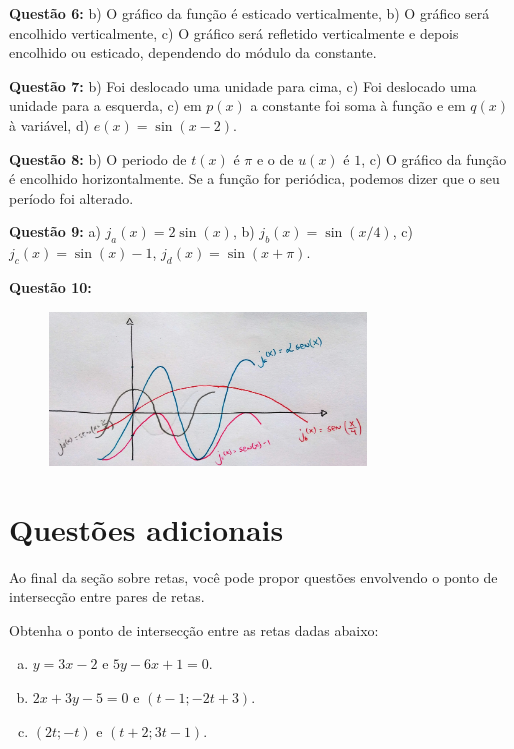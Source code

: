 \documentclass[main_estudante.tex]{subfiles}
\begin{document}
\noindent\textbf{Questão 6:} b) O gráfico da função é esticado verticalmente, b) O gráfico será encolhido verticalmente, c) O gráfico será refletido verticalmente e depois encolhido ou esticado, dependendo do módulo da constante.

\noindent\textbf{Questão 7:} b) Foi deslocado uma unidade para cima, c) Foi deslocado uma unidade para a esquerda, c) em $p(x)$ a constante foi soma à função e em $q(x)$ à variável, d) $e(x)=\sin(x-2)$.

\noindent\textbf{Questão 8:} b) O periodo de $t(x)$ é $\pi$ e o de $u(x)$ é $1$, c) O gráfico da função é encolhido horizontalmente. Se a função for periódica, podemos dizer que o seu período foi alterado.

\noindent\textbf{Questão 9:} a) $j_a(x)=2\sin(x)$, b) $j_b(x)=\sin(x/4)$, c)$j_c(x)=\sin(x)-1$, $j_d(x)=\sin(x+\pi)$.

\noindent\textbf{Questão 10:}

\begin{figure}[h]
\centering
\includegraphics[width=0.75\textwidth]{./img/c7g10.jpg}
\end{figure}

\section{Questões adicionais}

Ao final da seção sobre retas, você pode propor questões envolvendo o ponto de intersecção entre pares de retas.

\begin{questao}
Obtenha o ponto de intersecção entre as retas dadas abaixo:
\begin{enumerate}[a)]
\item $y=3x-2$ e $5y-6x+1=0$.
\item $2x+3y-5=0$ e $(t-1;-2t+3)$.
\item $(2t;-t)$ e $(t+2;3t-1)$.
\end{enumerate} 
\end{questao}
\end{document}
